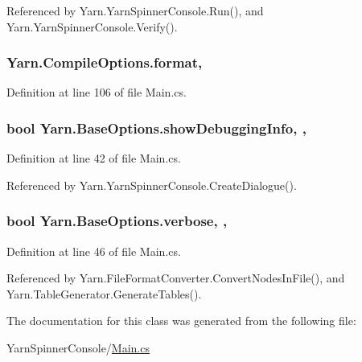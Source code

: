 Referenced by Yarn.\-Yarn\-Spinner\-Console.\-Run(), and Yarn.\-Yarn\-Spinner\-Console.\-Verify().

\hypertarget{a00054_a9904ccfb1b0ff64df415c4fc9fe6eb1c}{
\subsubsection[{format}]{ Yarn.\-Compile\-Options.\-format\hspace{0.3cm}{\ttfamily [get]}, {\ttfamily [set]}}}\label{a00054_a9904ccfb1b0ff64df415c4fc9fe6eb1c}


Definition at line 106 of file Main.\-cs.

\hypertarget{a00042_a89964ea17bd19caf00cb5bff563ed01c}{
\subsubsection[{show\-Debugging\-Info}]{\setlength{\rightskip}{0pt plus 5cm}bool Yarn.\-Base\-Options.\-show\-Debugging\-Info\hspace{0.3cm}{\ttfamily [get]}, {\ttfamily [set]}, {\ttfamily [inherited]}}}\label{a00042_a89964ea17bd19caf00cb5bff563ed01c}


Definition at line 42 of file Main.\-cs.



Referenced by Yarn.\-Yarn\-Spinner\-Console.\-Create\-Dialogue().

\hypertarget{a00042_ada4d83d1756918f362d55f6649b82b17}{
\subsubsection[{verbose}]{\setlength{\rightskip}{0pt plus 5cm}bool Yarn.\-Base\-Options.\-verbose\hspace{0.3cm}{\ttfamily [get]}, {\ttfamily [set]}, {\ttfamily [inherited]}}}\label{a00042_ada4d83d1756918f362d55f6649b82b17}


Definition at line 46 of file Main.\-cs.



Referenced by Yarn.\-File\-Format\-Converter.\-Convert\-Nodes\-In\-File(), and Yarn.\-Table\-Generator.\-Generate\-Tables().



The documentation for this class was generated from the following file\-:\begin{DoxyCompactItemize}
\item 
Yarn\-Spinner\-Console/\hyperlink{a00303}{Main.\-cs}\end{DoxyCompactItemize}
